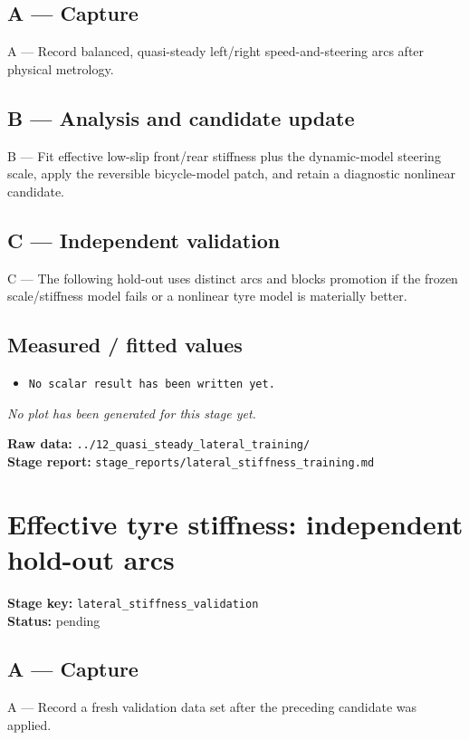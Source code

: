 \documentclass[11pt,a4paper]{article}
\begin{document}
\subsection*{A --- Capture}
A — Record balanced, quasi-steady left/right speed-and-steering arcs after physical metrology.

\subsection*{B --- Analysis and candidate update}
B — Fit effective low-slip front/rear stiffness plus the dynamic-model steering scale, apply the reversible bicycle-model patch, and retain a diagnostic nonlinear candidate.

\subsection*{C --- Independent validation}
C — The following hold-out uses distinct arcs and blocks promotion if the frozen scale/stiffness model fails or a nonlinear tyre model is materially better.

\subsection*{Measured / fitted values}
\begin{itemize}\setlength\itemsep{0pt}
\item \texttt{No scalar result has been written yet.}
\end{itemize}

\textit{No plot has been generated for this stage yet.}

\vfill
\textbf{Raw data:} \texttt{../12\_quasi\_steady\_lateral\_training/}\\
\textbf{Stage report:} \texttt{stage\_reports/lateral\_stiffness\_training.md}
\clearpage
\small
\section*{Effective tyre stiffness: independent hold-out arcs}
\textbf{Stage key:} \texttt{lateral\_stiffness\_validation}\\
\textbf{Status:} pending\\

\subsection*{A --- Capture}
A — Record a fresh validation data set after the preceding candidate was applied.
\end{document}
